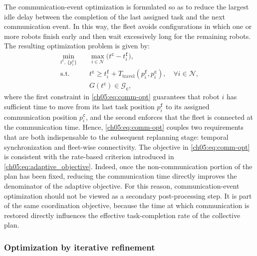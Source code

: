The communication-event optimization is formulated so as to reduce the largest
idle delay between the completion of the last assigned task and the next
communication event. In this way, the fleet avoids configurations in which one
or more robots finish early and then wait excessively long for the remaining
robots. The resulting optimization problem is given by:
\begin{equation}
\begin{aligned}
\min_{t^{\texttt{c}},\, \{p_i^{\texttt{c}}\}} \quad &
\max_{i \in \mathcal{N}} \bigl(t^{\texttt{c}} - t_i^{\texttt{f}}\bigr), \\
\text{s.t.} \quad &
t^{\texttt{c}} \geq t_i^{\texttt{f}} +
T_{\text{travel}}(p_i^{\texttt{f}}, p_i^{\texttt{c}}),
\quad \forall i \in \mathcal{N}, \\
&
G(t^{\texttt{c}}) \in \mathcal{G}_{\texttt{c}},
\end{aligned}
\label{ch05:eq:comm-opt}
\end{equation}
where the first constraint in \eqref{ch05:eq:comm-opt} guarantees that robot
$i$ has sufficient time to move from its last task position
$p_i^{\texttt{f}}$ to its assigned communication position
$p_i^{\texttt{c}}$, and the second enforces that the fleet is connected at the
communication time. Hence, \eqref{ch05:eq:comm-opt} couples two requirements
that are both indispensable to the subsequent replanning stage: temporal
synchronization and fleet-wise connectivity.
The objective in \eqref{ch05:eq:comm-opt} is consistent with the rate-based
criterion introduced in \eqref{ch05:eq:adaptive_objective}. Indeed, once the
non-communication portion of the plan has been fixed, reducing the communication
time directly improves the denominator of the adaptive objective. For this
reason, communication-event optimization should not be viewed as a secondary
post-processing step. It is part of the same coordination objective, because
the time at which communication is restored directly influences the effective
task-completion rate of the collective plan.

\subsubsection{Optimization by iterative refinement}
\label{ch05:subsubsec:comm-event-algorithm}

